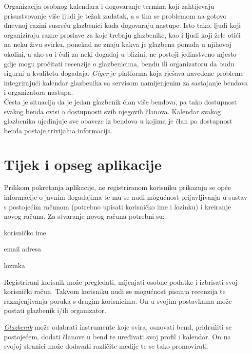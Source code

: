 		Organizacija osobnog kalendara i dogovaranje termina koji zahtijevaju prisustvovanje više ljudi je težak zadatak, a s tim se problemom na gotovo dnevnoj razini susreću glazbenici kada dogovaraju nastupe. Isto tako, ljudi koji organiziraju razne proslave za koje trebaju glazbenike, kao i ljudi koji žele otići na neku živu svirku, ponekad ne znaju kakva je glazbena ponuda u njihovoj okolini, a ako su i čuli za neki događaj u blizini, ne postoji jedinstveno mjesto gdje mogu pročitati recenzije o glazbenicima, bendu ili organizatoru da budu sigurni u kvalitetu događaja.
		\textit{Giger} je platforma koja rješava navedene probleme integrirajući kalendar glazbenika sa servisom namijenjenim za sastajanje bendova i organizatora nastupa. 
		\\
		
		Česta je situacija da je jedan glazbenik član više bendova, pa tako dostupnost svakog benda ovisi o dostupnosti svih njegovih članova.  Kalendar svakog glazbenika ujedinjuje sve obaveze iz bendova u kojima je član pa dostupnost benda postaje trivijalna informacija. 
		
		
		
		\section{Tijek i opseg aplikacije}
		
		Prilikom pokretanja aplikacije, ne registriranom korisniku prikazuju se opće informacije o javnim događajima te mu se nudi mogućnost prijavljivanja u sustav s postojećim računom (potrebno upisati korisničko ime i lozinku) i kreiranje novog računa. Za stvaranje novog računa potrebni su: 
		
		\begin{packed_item}
			\item korisničko ime
			\item email adresa
			\item lozinka
		\end{packed_item}
	
		Registrirani korisnik može pregledati, mijenjati osobne podatke i izbrisati svoj korisnički račun. Takvom korisniku nudi se mogućnost pisanja recenzija te razmjenjivanja poruka s drugim korisnicima. On u svojim postavkama može postati glazbenik i/ili organizator.
		
		\textit{\underline{Glazbenik}} može odabrati instrumente koje svira, osnovati bend, pridružiti se postojećem, dodati članove u bend te uređivati svoj profil i kalendar. On na svojoj stranici može dodavati različite medije te se tako promovirati. 
		
